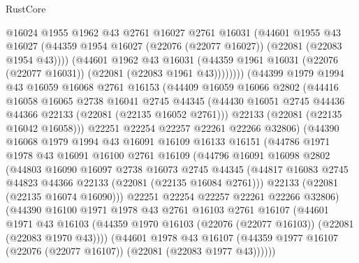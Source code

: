 \begin{lexlean}{RustCore}
\begin{coremodule}
                @16024
                @1955
                @1962
                @43
                @2761
                @16027
                @2761
                @16031
                (@44601
                  @1955
                  @43
                  @16027
                  (@44359 @1954 @16027 (@22076 (@22077 @16027)) (@22081 (@22083 @1954 @43))))
                (@44601
                  @1962
                  @43
                  @16031
                  (@44359 @1961 @16031 (@22076 (@22077 @16031)) (@22081 (@22083 @1961 @43))))))))
        (@44399
          @1979
          @1994
          @43
          @16059
          @16068
          @2761
          @16153
          (@44409
            @16059
            @16066
            @2802
            (@44416
              @16058
              @16065
              @2738
              @16041
              @2745
              @44345
              (@44430 @16051 @2745 @44436 @44366 @22133 (@22081 (@22135 @16052 @2761)))
              @22133
              (@22081 (@22135 @16042 @16058)))
            @22251
            @22254
            @22257
            @22261
            @22266
            @32806)
          (@44390
            @16068
            @1979
            @1994
            @43
            @16091
            @16109
            @16133
            @16151
            (@44786
              @1971
              @1978
              @43
              @16091
              @16100
              @2761
              @16109
              (@44796
                @16091
                @16098
                @2802
                (@44803
                  @16090
                  @16097
                  @2738
                  @16073
                  @2745
                  @44345
                  (@44817 @16083 @2745 @44823 @44366 @22133 (@22081 (@22135 @16084 @2761)))
                  @22133
                  (@22081 (@22135 @16074 @16090)))
                @22251
                @22254
                @22257
                @22261
                @22266
                @32806)
              (@44390
                @16100
                @1971
                @1978
                @43
                @2761
                @16103
                @2761
                @16107
                (@44601
                  @1971
                  @43
                  @16103
                  (@44359 @1970 @16103 (@22076 (@22077 @16103)) (@22081 (@22083 @1970 @43))))
                (@44601
                  @1978
                  @43
                  @16107
                  (@44359 @1977 @16107 (@22076 (@22077 @16107)) (@22081 (@22083 @1977 @43))))))

\end{coremodule}
\end{lexlean}
